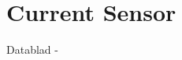 \documentclass[../main]{subfiles}
\begin{document}
\section{Current Sensor}
\label{sec:indledning}


Datablad -
\cite{xilinx2019fpga}
\end{document}
